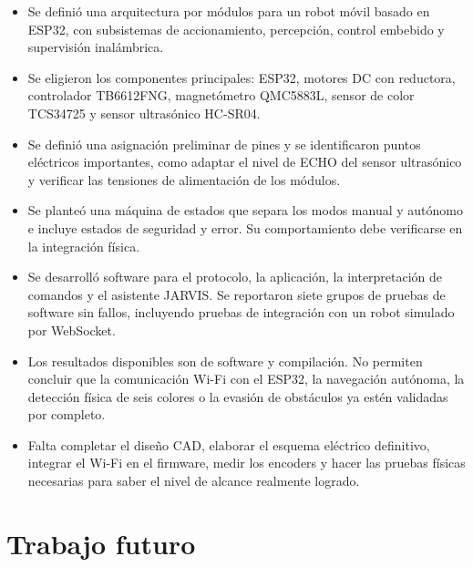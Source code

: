 \documentclass[journal]{IEEEtran}
\begin{document}
\begin{itemize}
    \item Se definió una arquitectura por módulos para un robot móvil basado en ESP32, con subsistemas de accionamiento, percepción, control embebido y supervisión inalámbrica.

    \item Se eligieron los componentes principales: ESP32, motores DC con reductora, controlador TB6612FNG, magnetómetro QMC5883L, sensor de color TCS34725 y sensor ultrasónico HC-SR04.

    \item Se definió una asignación preliminar de pines y se identificaron puntos eléctricos importantes, como adaptar el nivel de ECHO del sensor ultrasónico y verificar las tensiones de alimentación de los módulos.

    \item Se planteó una máquina de estados que separa los modos manual y autónomo e incluye estados de seguridad y error. Su comportamiento debe verificarse en la integración física.

    \item Se desarrolló software para el protocolo, la aplicación, la interpretación de comandos y el asistente JARVIS. Se reportaron siete grupos de pruebas de software sin fallos, incluyendo pruebas de integración con un robot simulado por WebSocket.

    \item Los resultados disponibles son de software y compilación. No permiten concluir que la comunicación Wi-Fi con el ESP32, la navegación autónoma, la detección física de seis colores o la evasión de obstáculos ya estén validadas por completo.

    \item Falta completar el diseño CAD, elaborar el esquema eléctrico definitivo, integrar el Wi-Fi en el firmware, medir los encoders y hacer las pruebas físicas necesarias para saber el nivel de alcance realmente logrado.
\end{itemize}


\section{Trabajo futuro}
\end{document}
